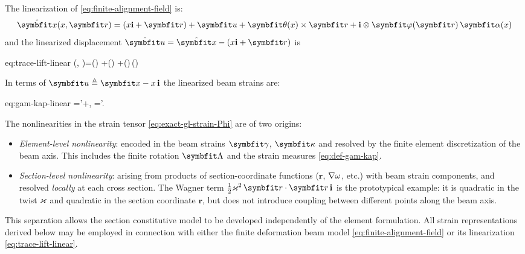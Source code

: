\begin{remark}
The linearization of \eqref{eq:finite-alignment-field} is:
\begin{equation}
\hat{\bm x}(\reflenx, \bm{r})=(\reflenx\FrameBasis+\bm{r})
+\bm{u} + \bm\theta(\reflenx)\times\bm{r}
+\FrameBasis\otimes\WarpAxialShapes(\bm{r})\,\bm\alpha(\reflenx)
\label{eq:linear-alignment-field}
\end{equation}
and the linearized displacement \(\hat{\bm{u}} = \hat{\bm{x}} - (\reflenx\FrameBasis + \bm{r})\) is
\begin{SaveEquation}{eq:trace-lift-linear}
(, )=()
+\bm\theta()\times{}
+\FrameBasis\otimes\WarpAxialShapes()\,\bm\alpha()
\end{SaveEquation}
In terms of \(\bm{u}\triangleq\bm{x}- \reflenx\,\FrameBasis\) the linearized beam strains are:
\begin{SaveEquation}{eq:gam-kap-linear}
\bm{\gamma}='+\FrameBasis\times\bm\theta,\qquad
\bm{\kappa}=\bm\theta'.
\end{SaveEquation}
\end{remark}

\begin{remark}
The nonlinearities in the strain tensor \eqref{eq:exact-gl-strain-Phi} are of two origins:
\begin{itemize}
    \item \emph{Element-level nonlinearity}: encoded in the beam strains \(\ShearStrain\), \(\CurveStrain\) and resolved by the finite element discretization of the beam axis.
    This includes the finite rotation \(\FrameRotation\) and the strain measures \eqref{eq:def-gam-kap}.
    \item \emph{Section-level nonlinearity}: arising from products of section-coordinate functions (\(\bm{r}\), \(\nabla\omega\), etc.) with beam strain components, and resolved \emph{locally} at each cross section. The Wagner term \(\tfrac{1}{2}\Twist^2\,\bm{r}\cdot\bm{r}\,\FrameBasis\) is the prototypical example: it is quadratic in the twist \(\varkappa\) and quadratic in the section coordinate \(\bm{r}\), but does not introduce coupling between different points along the beam axis.
\end{itemize}
This separation allows the section constitutive model to be developed independently of the element formulation. 
All strain representations derived below may be employed in connection with either the finite deformation beam model \eqref{eq:finite-alignment-field} or its linearization \eqref{eq:trace-lift-linear}.
\end{remark}



